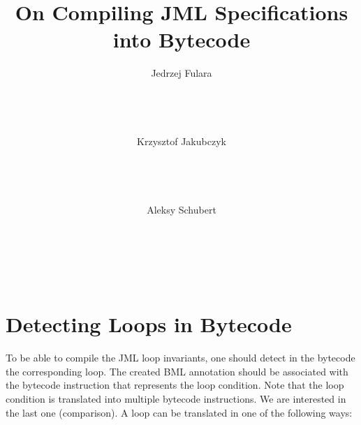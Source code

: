 \documentclass{acm_proc_article-sp}
\author{
\alignauthor
Jedrzej Fulara\\
\affaddr{Institute of Informatics}\\
\affaddr{University of Warsaw}\\
\affaddr{ul. Banacha 2}\\
\affaddr{02-097 Warsaw, Poland}\\
\email{fulara@mimuw.edu.pl}
\alignauthor
Krzysztof Jakubczyk\\
\affaddr{Institute of Informatics}\\
\affaddr{University of Warsaw}\\
\affaddr{ul. Banacha 2}\\
\affaddr{02-097 Warsaw, Poland}\\
\email{kjk@mimuw.edu.pl}
\alignauthor
Aleksy Schubert\\
\affaddr{Institute of Informatics}\\
\affaddr{University of Warsaw}\\
\affaddr{ul. Banacha 2}\\
\affaddr{02-097 Warsaw, Poland}\\
\email{alx@mimuw.edu.pl}
}
\title{On Compiling JML Specifications into Bytecode}
\begin{document}
\maketitle



\section{Detecting Loops in Bytecode}\label{loopDetection}
To be able to compile the JML loop invariants, one should detect in the bytecode the corresponding loop. The created BML annotation should be associated with the bytecode instruction that represents the loop condition. Note that the loop condition is translated into multiple bytecode instructions. We are interested in the last one (comparison). A loop can be translated in one of the following ways:
\end{document}
